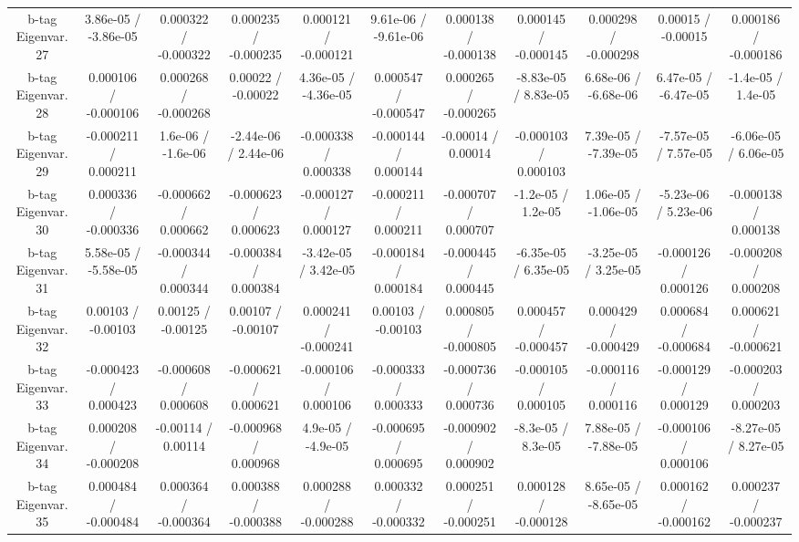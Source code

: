 \begin{table}[htbp]
\begin{center}
\begin{tabular}{|c|c|c|c|c|c|c|c|c|c|c|}
  b-tag Eigenvar. 27 & 3.86e-05 / -3.86e-05 & 0.000322 / -0.000322 & 0.000235 / -0.000235 & 0.000121 / -0.000121 & 9.61e-06 / -9.61e-06 & 0.000138 / -0.000138 & 0.000145 / -0.000145 & 0.000298 / -0.000298 & 0.00015 / -0.00015 & 0.000186 / -0.000186 \\ 
  b-tag Eigenvar. 28 & 0.000106 / -0.000106 & 0.000268 / -0.000268 & 0.00022 / -0.00022 & 4.36e-05 / -4.36e-05 & 0.000547 / -0.000547 & 0.000265 / -0.000265 & -8.83e-05 / 8.83e-05 & 6.68e-06 / -6.68e-06 & 6.47e-05 / -6.47e-05 & -1.4e-05 / 1.4e-05 \\ 
  b-tag Eigenvar. 29 & -0.000211 / 0.000211 & 1.6e-06 / -1.6e-06 & -2.44e-06 / 2.44e-06 & -0.000338 / 0.000338 & -0.000144 / 0.000144 & -0.00014 / 0.00014 & -0.000103 / 0.000103 & 7.39e-05 / -7.39e-05 & -7.57e-05 / 7.57e-05 & -6.06e-05 / 6.06e-05 \\ 
  b-tag Eigenvar. 30 & 0.000336 / -0.000336 & -0.000662 / 0.000662 & -0.000623 / 0.000623 & -0.000127 / 0.000127 & -0.000211 / 0.000211 & -0.000707 / 0.000707 & -1.2e-05 / 1.2e-05 & 1.06e-05 / -1.06e-05 & -5.23e-06 / 5.23e-06 & -0.000138 / 0.000138 \\ 
  b-tag Eigenvar. 31 & 5.58e-05 / -5.58e-05 & -0.000344 / 0.000344 & -0.000384 / 0.000384 & -3.42e-05 / 3.42e-05 & -0.000184 / 0.000184 & -0.000445 / 0.000445 & -6.35e-05 / 6.35e-05 & -3.25e-05 / 3.25e-05 & -0.000126 / 0.000126 & -0.000208 / 0.000208 \\ 
  b-tag Eigenvar. 32 & 0.00103 / -0.00103 & 0.00125 / -0.00125 & 0.00107 / -0.00107 & 0.000241 / -0.000241 & 0.00103 / -0.00103 & 0.000805 / -0.000805 & 0.000457 / -0.000457 & 0.000429 / -0.000429 & 0.000684 / -0.000684 & 0.000621 / -0.000621 \\ 
  b-tag Eigenvar. 33 & -0.000423 / 0.000423 & -0.000608 / 0.000608 & -0.000621 / 0.000621 & -0.000106 / 0.000106 & -0.000333 / 0.000333 & -0.000736 / 0.000736 & -0.000105 / 0.000105 & -0.000116 / 0.000116 & -0.000129 / 0.000129 & -0.000203 / 0.000203 \\ 
  b-tag Eigenvar. 34 & 0.000208 / -0.000208 & -0.00114 / 0.00114 & -0.000968 / 0.000968 & 4.9e-05 / -4.9e-05 & -0.000695 / 0.000695 & -0.000902 / 0.000902 & -8.3e-05 / 8.3e-05 & 7.88e-05 / -7.88e-05 & -0.000106 / 0.000106 & -8.27e-05 / 8.27e-05 \\ 
  b-tag Eigenvar. 35 & 0.000484 / -0.000484 & 0.000364 / -0.000364 & 0.000388 / -0.000388 & 0.000288 / -0.000288 & 0.000332 / -0.000332 & 0.000251 / -0.000251 & 0.000128 / -0.000128 & 8.65e-05 / -8.65e-05 & 0.000162 / -0.000162 & 0.000237 / -0.000237 \\ 

\end{tabular}
\end{center}
\end{table}

